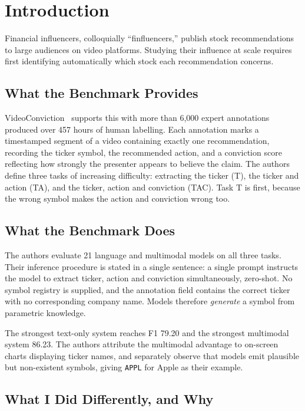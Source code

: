 \documentclass[conference]{IEEEtran}
\begin{document}
\section{Introduction}

Financial influencers, colloquially ``finfluencers,'' publish stock
recommendations to large audiences on video platforms. Studying their influence
at scale requires first identifying automatically which stock each
recommendation concerns.

\subsection{What the Benchmark Provides}

VideoConviction~\cite{videoconviction} supports this with more than 6{,}000
expert annotations produced over 457 hours of human labelling. Each annotation
marks a timestamped segment of a video containing exactly one recommendation,
recording the ticker symbol, the recommended action, and a conviction score
reflecting how strongly the presenter appears to believe the claim. The authors
define three tasks of increasing difficulty: extracting the ticker (T), the
ticker and action (TA), and the ticker, action and conviction (TAC). Task T is
first, because the wrong symbol makes the action and conviction wrong
too.

\subsection{What the Benchmark Does}

The authors evaluate 21 language and multimodal models on all three tasks. Their
inference procedure is stated in a single sentence: a single prompt instructs
the model to extract ticker, action and conviction simultaneously, zero-shot.
No symbol registry is supplied, and the annotation field contains the correct
ticker with no corresponding company name. Models therefore \emph{generate} a
symbol from parametric knowledge.

The strongest text-only system reaches F1 79.20 and the strongest multimodal
system 86.23. The authors attribute the multimodal advantage to on-screen charts
displaying ticker names, and separately observe that models emit plausible but
non-existent symbols, giving \texttt{APPL} for Apple as their example.

\subsection{What I Did Differently, and Why}
\end{document}
